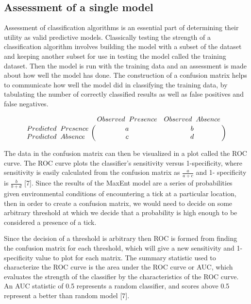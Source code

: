\subsection{Assessment of a single model}

Assessment of classification algorithms is an essential part of determining their utility as valid predictive models. Classically testing the strength of a classification algorithm involves building the model with a subset of the dataset and keeping another subset for use in testing the model called the training dataset. Then the model is run with the training data and an assessment is made about how well the model has done. The construction of a confusion matrix helps to communicate how well the model did in classifying the training data, by tabulating the number of correctly classified results as well as false positives and false negatives. 

\begin{equation} \bordermatrix{~ & Observed \hspace{0.2cm} Presence & Observed \hspace{0.2cm} Absence \cr
                  Predicted\hspace{0.2cm}  Presence & a & b \cr
                  Predicted \hspace{0.2cm} Absence & c & d \cr} \end{equation}
                  
\noindent The data in the confusion matrix can then be visualized in a plot called the ROC curve. The ROC curve plots the classifier's sensitivity versus 1-specificity, where sensitivity is easily calculated from the confusion matrix as  $\frac{a}{a+c}$ and 1- specificity is $\frac{b}{b+d}$ [7]. Since the results of the MaxEnt model are a series of probabilities given environmental conditions of encountering a tick at a particular location, then in order to create a confusion matrix, we would need to decide on some arbitrary threshold at which we decide that a probability is high enough to be considered a presence of a tick. \newline

\noindent Since the decision of a threshold is arbitrary then ROC is formed from finding the confusion matrix for each threshold, which will give a new sensitivity and 1-specificity value to plot for each matrix. The summary statistic used to characterize the ROC curve is the area under the ROC curve or AUC, which evaluates the strength of the classifier by the characteristics of the ROC curve. An AUC statistic of 0.5 represents a random classifier, and scores above 0.5 represent a better than random model [7].    \newline

